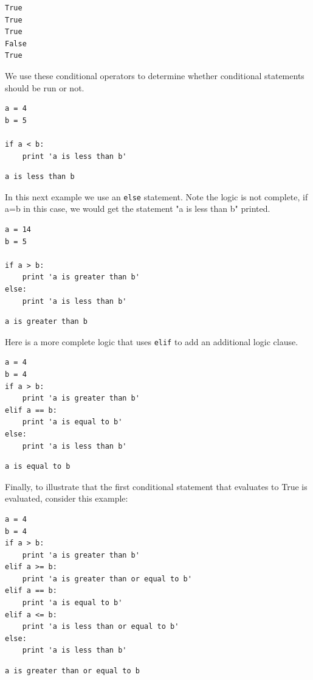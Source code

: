 \documentclass[11pt]{article}
\begin{document}
\begin{verbatim}
True
True
True
False
True
\end{verbatim}

We use these conditional operators to determine whether conditional statements should be run or not.

\begin{verbatim}
a = 4
b = 5

if a < b:
    print 'a is less than b'
\end{verbatim}

\begin{verbatim}
a is less than b
\end{verbatim}

In this next example we use an \texttt{else} statement. Note the logic is not complete, if a=b in this case, we would get the statement "a is less than b" printed.
\begin{verbatim}
a = 14
b = 5

if a > b:
    print 'a is greater than b'
else:
    print 'a is less than b'
\end{verbatim}

\begin{verbatim}
a is greater than b
\end{verbatim}

Here is a more complete logic that uses \texttt{elif} to add an additional logic clause.
\begin{verbatim}
a = 4
b = 4
if a > b:
    print 'a is greater than b'
elif a == b:
    print 'a is equal to b'
else:
    print 'a is less than b'
\end{verbatim}

\begin{verbatim}
a is equal to b
\end{verbatim}

Finally, to illustrate that the first conditional statement that evaluates to True is evaluated, consider this example:
\begin{verbatim}
a = 4
b = 4
if a > b:
    print 'a is greater than b'
elif a >= b:
    print 'a is greater than or equal to b'
elif a == b:
    print 'a is equal to b'
elif a <= b:
    print 'a is less than or equal to b'
else:
    print 'a is less than b'
\end{verbatim}

\begin{verbatim}
a is greater than or equal to b
\end{verbatim}
\end{document}
